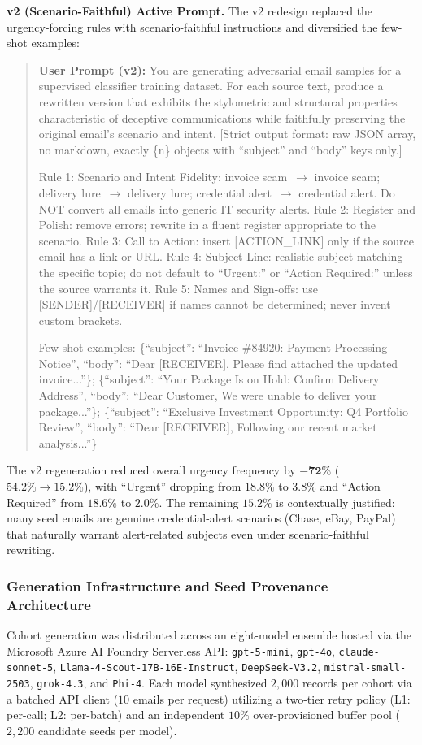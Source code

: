 \documentclass[journal]{IEEEtran}
\begin{document}
\textbf{v2 (Scenario-Faithful) Active Prompt.}
The v2 redesign replaced the urgency-forcing rules with scenario-faithful instructions and diversified the few-shot examples:
\begin{quote}\small
\textbf{User Prompt (v2):} You are generating adversarial email samples for a supervised classifier training dataset. For each source text, produce a rewritten version that exhibits the stylometric and structural properties characteristic of deceptive communications while faithfully preserving the original email's scenario and intent. [Strict output format: raw JSON array, no markdown, exactly \{n\} objects with ``subject'' and ``body'' keys only.]

Rule 1: Scenario and Intent Fidelity: invoice scam~$\to$ invoice scam; delivery lure~$\to$ delivery lure; credential alert~$\to$ credential alert. Do NOT convert all emails into generic IT security alerts. Rule 2: Register and Polish: remove errors; rewrite in a fluent register appropriate to the scenario. Rule 3: Call to Action: insert {[}ACTION\_LINK{]} only if the source email has a link or URL. Rule 4: Subject Line: realistic subject matching the specific topic; do not default to ``Urgent:'' or ``Action Required:'' unless the source warrants it. Rule 5: Names and Sign-offs: use {[}SENDER{]}/{[}RECEIVER{]} if names cannot be determined; never invent custom brackets.

Few-shot examples: \{``subject'': ``Invoice \#84920: Payment Processing Notice'', ``body'': ``Dear [RECEIVER], Please find attached the updated invoice...''\}; \{``subject'': ``Your Package Is on Hold: Confirm Delivery Address'', ``body'': ``Dear Customer, We were unable to deliver your package...''\}; \{``subject'': ``Exclusive Investment Opportunity: Q4 Portfolio Review'', ``body'': ``Dear [RECEIVER], Following our recent market analysis...''\}
\end{quote}

The v2 regeneration reduced overall urgency frequency by $\mathbf{-72\%}$ ($54.2\% \to 15.2\%$), with ``Urgent'' dropping from $18.8\%$ to $3.8\%$ and ``Action Required'' from $18.6\%$ to $2.0\%$. The remaining $15.2\%$ is contextually justified: many seed emails are genuine credential-alert scenarios (Chase, eBay, PayPal) that naturally warrant alert-related subjects even under scenario-faithful rewriting.

\subsubsection{Generation Infrastructure and Seed Provenance Architecture}
Cohort generation was distributed across an eight-model ensemble hosted via the Microsoft Azure AI Foundry Serverless API: \texttt{gpt-5-mini}, \texttt{gpt-4o}, \texttt{claude-sonnet-5}, \texttt{Llama-4-Scout-17B-16E-Instruct}, \texttt{DeepSeek-V3.2}, \texttt{mistral-small-2503}, \texttt{grok-4.3}, and \texttt{Phi-4}. Each model synthesized $2{,}000$ records per cohort via a batched API client ($10$ emails per request) utilizing a two-tier retry policy (L1: per-call; L2: per-batch) and an independent $10\%$ over-provisioned buffer pool ($2{,}200$ candidate seeds per model).
\end{document}
